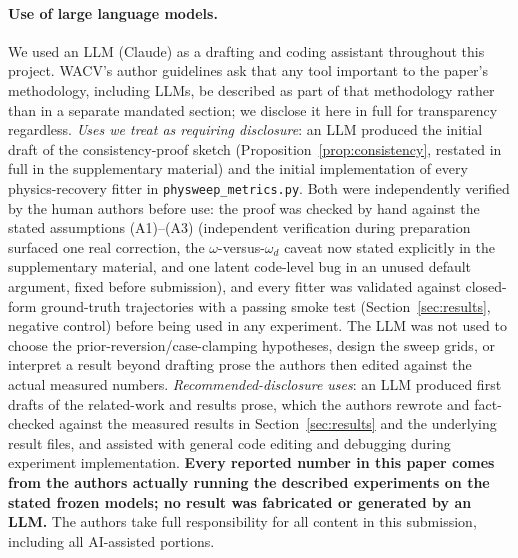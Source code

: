 \documentclass[10pt,twocolumn,letterpaper]{article}
\begin{document}
\paragraph{Use of large language models.}
We used an LLM (Claude) as a drafting and coding assistant throughout this
project. WACV's author guidelines ask that any tool important to the
paper's methodology, including LLMs, be described as part of that
methodology rather than in a separate mandated section; we disclose it here
in full for transparency regardless. \emph{Uses we treat as
requiring disclosure}: an LLM produced the initial draft of the consistency-proof sketch
(Proposition~\ref{prop:consistency}, restated in full in the supplementary
material) and the
initial implementation of every physics-recovery fitter in
\texttt{physweep\_metrics.py}. Both were independently verified by the
human authors before use: the proof was checked by hand against the stated
assumptions (A1)--(A3) (independent verification during preparation
surfaced one real correction, the $\omega$-versus-$\omega_d$ caveat now
stated explicitly in the supplementary material, and one latent code-level
bug in an unused default argument, fixed before submission), and every
fitter was validated against closed-form ground-truth trajectories with a
passing smoke test (Section~\ref{sec:results}, negative control) before being used in any
experiment. The LLM was not used to choose the prior-reversion/case-clamping hypotheses, design the
sweep grids, or interpret a result beyond drafting prose the authors then
edited against the actual measured numbers. \emph{Recommended-disclosure
uses}: an LLM produced first drafts of the related-work and results prose,
which the authors rewrote and fact-checked against the measured results in
Section~\ref{sec:results} and the underlying result files, and assisted
with general code editing and debugging during experiment implementation.
\textbf{Every reported number in this paper comes from the authors actually
running the described experiments on the stated frozen models; no result
was fabricated or generated by an LLM.} The authors take full
responsibility for all content in this submission, including all
AI-assisted portions.


{
    \small
    
    
}
\end{document}

